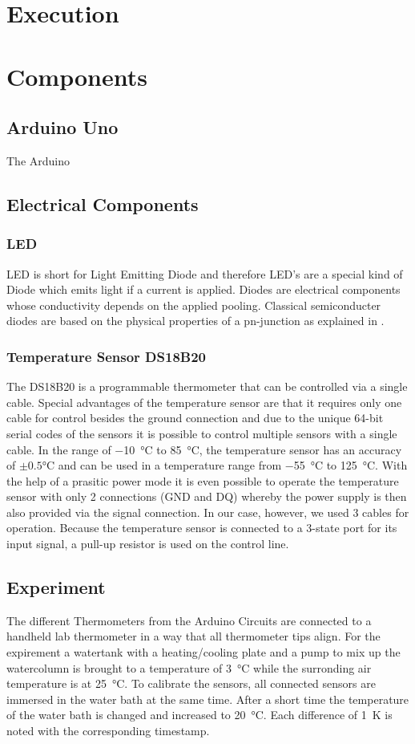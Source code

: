 \section{Execution}
\label{sec:execution}
\section{Components}
\subsection{Arduino Uno}
The Arduino
\subsection{Electrical Components}
\subsubsection{LED}
LED is short for Light Emitting Diode and therefore LED's are a special kind of Diode which emits light if a current is applied.
Diodes are electrical components whose conductivity depends on the applied pooling.
Classical semiconducter diodes are based on the physical properties of a pn-junction as explained in \cite{elektronik-kompendium}.
\subsubsection{Temperature Sensor DS18B20}
The DS18B20 is a programmable thermometer that can be controlled via a single cable.
Special advantages of the temperature sensor are that it requires only one cable for control besides the ground connection and due to the unique 64-bit serial codes of the sensors it is possible to control multiple sensors with a single cable.
In the range of \SI{-10}{\celsius} to \SI{85}{\celsius}, the temperature sensor has an accuracy of $\pm 0.5$\si{\celsius} and can be used in a temperature range from \SI{-55}{\celsius} to \SI{125}{\celsius}.
With the help of a prasitic power mode it is even possible to operate the temperature sensor with only 2 connections (GND and DQ) whereby the power supply is then also provided via the signal connection. In our case, however, we used 3 cables for operation.
Because the temperature sensor is connected to a 3-state port for its input signal, a pull-up resistor is used on the control line.

\subsection{Experiment}
The different Thermometers from the Arduino Circuits are connected to a handheld lab thermometer in a way that all thermometer tips align.
For the expirement a watertank with a heating/cooling plate and a pump to mix up the watercolumn is brought to a temperature of \SI{3}{\celsius} while the surronding air temperature is at \SI{25}{\celsius}.
To calibrate the sensors, all connected sensors are immersed in the water bath at the same time.
After a short time the temperature of the water bath is changed and increased to \SI{20}{\celsius}.
Each difference of \SI{1}{\kelvin} is noted with the corresponding timestamp.

